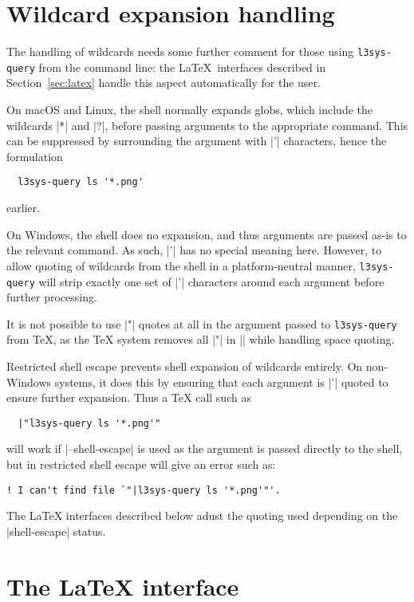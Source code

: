 \documentclass{l3doc}
\begin{document}
\begin{documentation}
\section{Wildcard expansion handling\label{sec:wildcard}}

The handling of wildcards needs some further comment for those using
\texttt{l3sys-query} from the command line: the \LaTeX\ interfaces described
in Section~\ref{sec:latex} handle this aspect automatically for the user.

On macOS and Linux, the shell normally expands globs, which include the
wildcards |*| and |?|, before passing arguments to the appropriate command.
This can be suppressed by surrounding the argument with |'| characters, hence
the formulation
\begin{verbatim}
  l3sys-query ls '*.png'
\end{verbatim}
earlier.

On Windows, the shell does no expansion, and thus arguments are passed as-is to
the relevant command. As such, |'| has no special meaning here. However, to
allow quoting of wildcards from the shell in a platform-neutral manner,
\texttt{l3sys-query} will strip exactly one set of |'| characters around each
argument before further processing.

It is not possible to use |"| quotes at all in the argument passed to
\texttt{l3sys-query} from \TeX{}, as the \TeX{} system removes all |"| in
|| while handling space quoting.

Restricted shell escape prevents shell expansion of wildcards entirely. On
non-Windows systems, it does this by ensuring that each argument is |'| quoted
to ensure further expansion. Thus a \TeX{} call such as
\begin{verbatim}
  |"l3sys-query ls '*.png'"
\end{verbatim}
will work if |--shell-escape| is used as the argument is passed directly to the
shell, but in restricted shell escape will give an error such as:
\begin{verbatim}
! I can't find file `"|l3sys-query ls '*.png'"'.
\end{verbatim}
The \LaTeX{} interfaces described below adust the quoting used depending on the
|shell-escape| status.

\section{The \LaTeX{} interface\label{sec:latex}}


\end{documentation}
\end{document}
